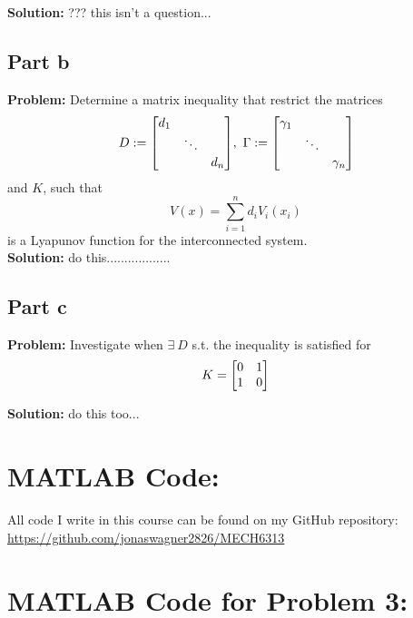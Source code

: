 \documentclass[letter]{article}
\begin{document}
\noindent
\textbf{Solution:}
??? this isn't a question...


\subsection{Part b}
\textbf{Problem:}
Determine a matrix inequality that restrict the matrices
$$D := \mqty[\dmat{d_1}{\ddots}{d_n}], \ \Gamma := \mqty[\dmat{\gamma_1}{\ddots}{\gamma_n}]$$
and $K$, such that $$V(x) = \sum_{i=1}^{n} d_i V_i(x_i)$$ is a Lyapunov function for the interconnected system.\\

\noindent
\textbf{Solution:}
do this..................



\subsection{Part c}
\textbf{Problem:}
Investigate when $\exists \ D$ s.t. the inequality is satisfied for $$K = \mqty[0&1\\1&0]$$

\noindent
\textbf{Solution:}
do this too...


























\newpage
\appendix
\section{MATLAB Code:}\label{apx:matlab}
All code I write in this course can be found on my GitHub repository:\\
\href{https://github.com/jonaswagner2826/MECH6313}{https://github.com/jonaswagner2826/MECH6313}


\newpage
\section{MATLAB Code for Problem 3:}\label{apx:matlabpblm3}

\end{document}
